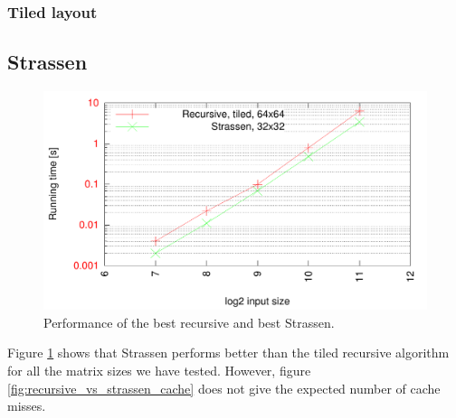 \subsubsection{Tiled layout}





\subsection{Strassen}


\begin{figure}[h!]
  \centering
  \includegraphics[width=\textwidth]{"../project2/gnuplots/recursive_vs_strassen_performance"}
  \caption{Performance of the best recursive and best Strassen.}
  \label{fig:recursive_vs_strassen_performance}
\end{figure}

Figure \ref{fig:recursive_vs_strassen_performance} shows that Strassen performs better than the tiled recursive algorithm for all the matrix sizes we have tested. However, figure \ref{fig:recursive_vs_strassen_cache} does not give the expected number of cache misses. 

